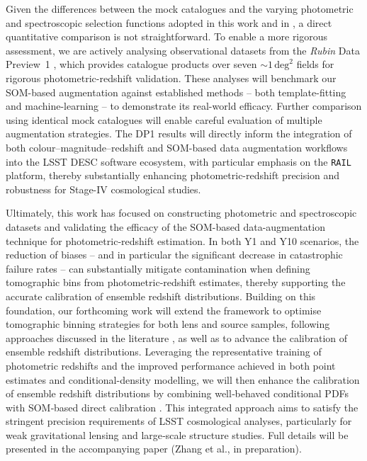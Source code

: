 Given the differences between the mock catalogues and the varying photometric and spectroscopic selection functions adopted in this work and in \citet{2024ApJ...967L...6M}, a direct quantitative comparison is not straightforward. To enable a more rigorous assessment, we are actively analysing observational datasets from the \textit{Rubin} Data Preview~1 \citep[DP1\footnote{\url{https://dp1.lsst.io}},][]{10.71929/rubin/2570308}, which provides catalogue products over seven \(\sim 1 \,\mathrm{deg}^2\) fields for rigorous photometric-redshift validation. These analyses will benchmark our SOM-based augmentation against established methods -- both template-fitting and machine-learning -- to demonstrate its real-world efficacy. Further comparison using identical mock catalogues will enable careful evaluation of multiple augmentation strategies. The DP1 results will directly inform the integration of both colour–magnitude–redshift and SOM-based data augmentation workflows into the LSST DESC software ecosystem, with particular emphasis on the \texttt{RAIL} platform, thereby substantially enhancing photometric-redshift precision and robustness for Stage-IV cosmological studies.

Ultimately, this work has focused on constructing photometric and spectroscopic datasets and validating the efficacy of the SOM-based data-augmentation technique for photometric‐redshift estimation. In both Y1 and Y10 scenarios, the reduction of biases -- and in particular the significant decrease in catastrophic failure rates -- can substantially mitigate contamination when defining tomographic bins from photometric‐redshift estimates, thereby supporting the accurate calibration of ensemble redshift distributions. Building on this foundation, our forthcoming work will extend the framework to optimise tomographic binning strategies for both lens and source samples, following approaches discussed in the literature \cite{2021OJAp....4E..13Z, 2023ApJ...950...49M}, as well as to advance the calibration of ensemble redshift distributions. Leveraging the representative training of photometric redshifts and the improved performance achieved in both point estimates and conditional-density modelling, we will then enhance the calibration of ensemble redshift distributions by combining well‐behaved conditional PDFs with SOM‐based direct calibration \citep{2019MNRAS.489..820B, 2020A&A...637A.100W, 2025A&A...703A.144W}. This integrated approach aims to satisfy the stringent precision requirements of LSST cosmological analyses, particularly for weak gravitational lensing and large‐scale structure studies. Full details will be presented in the accompanying paper (Zhang et al., in preparation).  